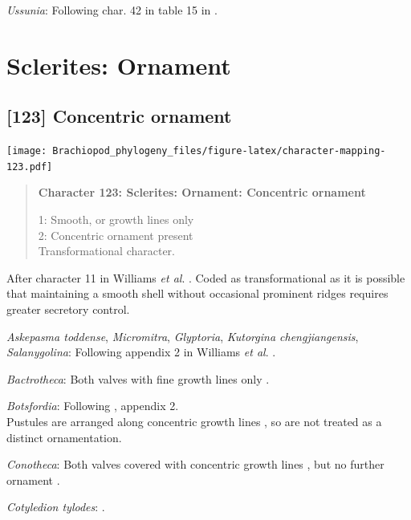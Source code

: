 \documentclass[openany]{book}
\begin{document}
\hypertarget{Ussunia-coding-122}{}
\emph{Ussunia}: Following char. 42 in table 15 in
\citet{Williams2000LinguliformeaCraniiformea}.

\section{Sclerites: Ornament}\label{sclerites-ornament}

\subsection*{{[}123{]} Concentric ornament}\label{concentric-ornament}

\texttt{[image: Brachiopod\_phylogeny\_files/figure-latex/character-mapping-123.pdf]}

\begin{quote}
\textbf{Character 123: Sclerites: Ornament: Concentric ornament}

1: Smooth, or growth lines only\\
2: Concentric ornament present\\
Transformational character.
\end{quote}

After character 11 in Williams \emph{et al}.
\citeyearpar{Williams1998Thediversity}. Coded as transformational as it
is possible that maintaining a smooth shell without occasional prominent
ridges requires greater secretory control.

\hypertarget{Askepasma_toddense-coding-123}{}
\emph{Askepasma toddense}, \emph{Micromitra}, \emph{Glyptoria},
\emph{Kutorgina chengjiangensis}, \emph{Salanygolina}: Following
appendix 2 in Williams \emph{et al}.
\citeyearpar{Williams1998Thediversity}.

\hypertarget{Bactrotheca-coding-123}{}
\emph{Bactrotheca}: Both valves with fine growth lines only
\citep{Valent2012}.

\hypertarget{Botsfordia-coding-123}{}
\emph{Botsfordia}: Following \citet{Williams1998Thediversity}, appendix
2.\\
Pustules are arranged along concentric growth lines
\citep{Skovsted2005EarlyCambrian}, so are not treated as a distinct
ornamentation.

\hypertarget{Conotheca-coding-123}{}
\emph{Conotheca}: Both valves covered with concentric growth lines
\citep{Devaere2014}, but no further ornament \citep{Wrona2003}.

\hypertarget{Cotyledion_tylodes-coding-123}{}
\emph{Cotyledion tylodes}: \citet{Zhang2013}.
\end{document}
